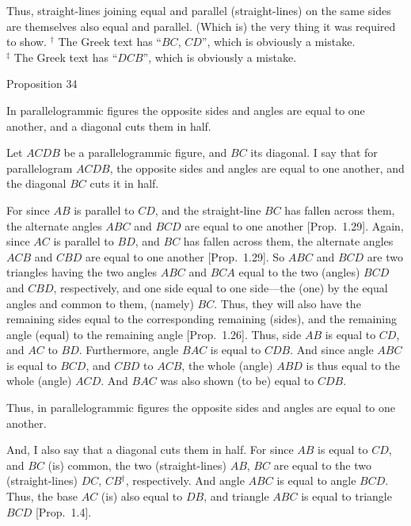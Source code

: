 Thus, straight-lines joining equal and parallel (straight-lines) on the same sides
are  themselves also equal and parallel. (Which is) the very thing it was
required to show.
{\footnotesize \noindent$^\dag$ The Greek text has ``$BC$, $CD$'', which is obviously a mistake.} \\
{\footnotesize \noindent$^\ddag$ The Greek text has ``$DCB$'', which is obviously a mistake.} 


\begin{center}
{\large Proposition 34}
\end{center}
In parallelogrammic figures the opposite sides and angles are equal to one
another, and a diagonal cuts them in half.\\

\epsfysize=1.7in
\centerline{}

Let $ACDB$ be a parallelogrammic figure, and $BC$ its diagonal. I say that
for parallelogram $ACDB$, the opposite sides and angles are equal to
one another, and the diagonal $BC$ cuts it in half.

For since $AB$ is parallel to $CD$, and the straight-line $BC$ has fallen
across  them, the alternate angles $ABC$ and $BCD$ are equal to one another [Prop.~1.29]. 
Again, since $AC$ is parallel to $BD$, and $BC$ has fallen across them, the
alternate angles $ACB$ and $CBD$ are equal to one another [Prop.~1.29]. 
So $ABC$ and $BCD$ are two triangles having the two angles $ABC$ and
$BCA$ equal to the two (angles) $BCD$ and $CBD$, respectively, and one
side equal to one side---the (one) by the equal angles and common to them, (namely) $BC$. Thus,
they will also  have the remaining sides  equal to the corresponding
remaining (sides), and the remaining angle (equal) to the remaining angle [Prop.~1.26].
Thus, side $AB$ is equal to $CD$, and $AC$ to $BD$. Furthermore, angle $BAC$ is 
equal to $CDB$. And since angle $ABC$ is equal to $BCD$, and $CBD$ to
$ACB$, the whole (angle) $ABD$ is thus equal to the whole (angle) $ACD$.
And  $BAC$ was also shown  (to be) equal to $CDB$.

Thus, in parallelogrammic figures the opposite sides and angles are equal
to one another.

And, I also say that a diagonal cuts them in half. For since $AB$ is equal
to $CD$, and $BC$ (is) common, the two (straight-lines) $AB$, $BC$ are equal
to the two (straight-lines) $DC$, $CB$$^\dag$, respectively. And angle $ABC$ is
equal to angle $BCD$. Thus, the base $AC$ (is) also equal to $DB$, and
triangle $ABC$ is equal to triangle $BCD$ [Prop.~1.4].

